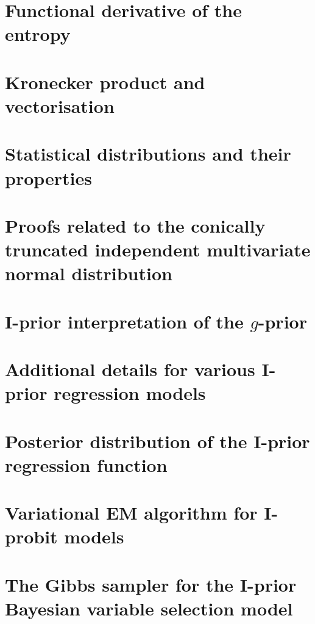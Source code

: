 \documentclass[showframe,11pt]{report}
\begin{document}

\appendix

\chapter{Functional derivative of the entropy}\label{apx:funcder}


\chapter{Kronecker product and vectorisation}


\chapter{Statistical distributions and their properties}


\chapter{Proofs related to the conically truncated independent multivariate normal distribution}\label{apx:contrunproof}


\chapter{I-prior interpretation of the $g$-prior}\label{misc:gprior}


\chapter{Additional details for various I-prior regression models}


\chapter{Posterior distribution of the I-prior regression function}


\chapter{Variational EM algorithm for I-probit models}


\chapter{The Gibbs sampler for the I-prior Bayesian variable selection model}\label{apx:gibbsbvs}

 
\hClosingStuffStandalone
\end{document}
